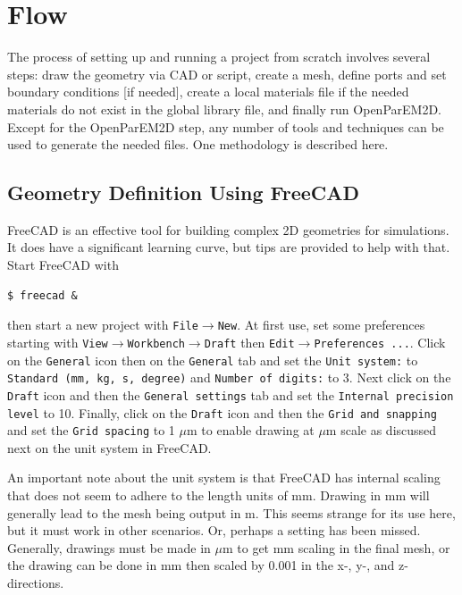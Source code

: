 \documentclass[titlepage]{article}
\renewcommand\_{\textunderscore\linebreak[1]}
\begin{document}
\section{Flow}

The process of setting up and running a project from scratch involves several steps: draw the geometry via CAD or script, create a mesh, define ports and set boundary conditions [if needed], create a local materials file if the needed materials do not exist in the global library file, and finally run OpenParEM2D.  Except for the OpenParEM2D step, any number of tools and techniques can be used to generate the needed files.  One methodology is described here.

\subsection{Geometry Definition Using FreeCAD}
\label{sec:freecad}

FreeCAD is an effective tool for building complex 2D geometries for simulations.  It does have a significant learning curve, but tips are provided to help with that.  Start FreeCAD with
\begin{Verbatim}[fontsize=\small]
   $ freecad &
\end{Verbatim}
\noindent then start a new project with \texttt{File}$\rightarrow$\texttt{New}.
At first use, set some preferences starting with \newline \texttt{View}$\rightarrow$\texttt{Workbench}$\rightarrow$\texttt{Draft} then \texttt{Edit}$\rightarrow$\texttt{Preferences ...}.
Click on the \texttt{General} icon then on the \texttt{General} tab and set the \texttt{Unit system:} to \texttt{Standard (mm, kg, s, degree)} and \texttt{Number of digits:} to 3.
Next click on the \texttt{Draft} icon and then the \texttt{General settings} tab and set the \texttt{Internal precision level} to 10. Finally, click on the \texttt{Draft} icon and then the \texttt{Grid and snapping} and set the \texttt{Grid spacing} to 1 $\mu$m to enable drawing at $\mu$m scale as discussed next on the unit system in FreeCAD.

An important note about the unit system is that FreeCAD has internal scaling that does not seem to adhere to the length units of mm.  Drawing in mm will generally lead to the mesh being output in m.  This seems strange for its use here, but it must work in other scenarios.  Or, perhaps a setting has been missed.  Generally, drawings must be made in $\mu$m to get mm scaling in the final mesh, or the drawing can be done in mm then scaled by 0.001 in the x-, y-, and z- directions.
\end{document}
